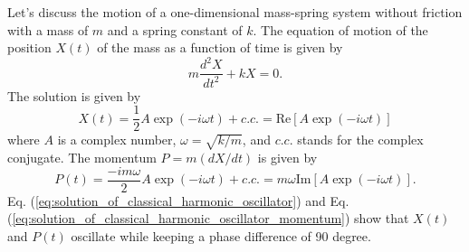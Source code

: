 \documentclass{book}
\begin{document}
Let's discuss the motion of a one-dimensional mass-spring system without friction with a mass of $m$ and a spring constant of $k$. The equation of motion of the position $X(t)$ of the mass as a function of time is given by
\begin{equation}
  m\frac{d^2X}{dt^2}+kX = 0.
\end{equation}
The solution is given by
\begin{equation}
  X(t) = \frac 1 2 A \exp (-i\omega t) + c.c. = \mathrm{Re}[A\exp(-i\omega t)]
 \label{eq:solution_of_classical_harmonic_oscillator}
\end{equation}
where $A$ is a complex number, $\omega = \sqrt{k/m}$, and $c.c.$ stands for the complex conjugate. The momentum $P = m (dX/dt)$ is given by
\begin{equation}
  P(t) = \frac {-im\omega}{2}A\exp(-i\omega t)+c.c. = m\omega\mathrm {Im}[A\exp(-i\omega t)].
  \label{eq:solution_of_classical_harmonic_oscillator_momentum}
\end{equation}
Eq. (\ref{eq:solution_of_classical_harmonic_oscillator}) and Eq. (\ref{eq:solution_of_classical_harmonic_oscillator_momentum}) show that $X(t)$ and $P(t)$ oscillate while keeping a phase difference of 90 degree.
\end{document}
